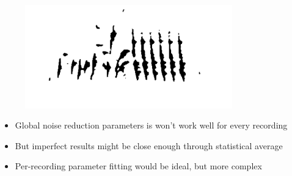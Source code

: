 \documentclass[t, xcolor={dvipsnames}]{beamer}
\begin{document}

\begin{frame}[fragile]
  \vspace{-0.5cm}
  \begin{figure}[!tfp]
    \centering
    \includegraphics[width=0.8\textwidth]{img/specgram-long-clean}
  \end{figure}

  \vspace{-1cm}

  \begin{addmargin}{0.5cm}
    \begin{itemize}
      \item Global noise reduction parameters is won't work well for every recording
      \item But imperfect results might be close enough through statistical average
      \item Per-recording parameter fitting would be ideal, but more complex
    \end{itemize}
  \end{addmargin}
\end{frame}


\end{document}
